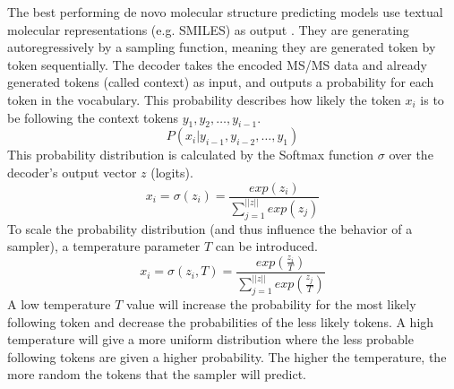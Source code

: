 The best performing de novo molecular structure predicting models use textual molecular representations (e.g. SMILES) as output \cite{litsa2021spec2mol, shrivastava2021massgenie, butler2023ms2mol}.
They are generating autoregressively by a sampling function, meaning they are generated token by token sequentially. The decoder takes the encoded \ac{MS/MS} data and already generated tokens (called context) as input, and outputs a probability for each token in the vocabulary. This probability describes how likely the token $x_i$ is to be following the context tokens $y_{1}, y_{2}, \dots, y_{i-1}$. 
\[P(x_i | y_{i-1},y_{i-2},\dots,y_{1})\]
This probability distribution is calculated by the Softmax function $\sigma$ \cite{nwankpa2018activation} over the decoder's output vector $z$ (logits).
\[x_i = \sigma(z_i) = \frac{exp(z_i)}{\sum\limits_{j=1}^{||z||} exp(z_j)}\]
To scale the probability distribution (and thus influence the behavior of a sampler), a temperature parameter $T$ can be introduced. 
\[x_i = \sigma(z_i, T) = \frac{exp(\frac{z_i}{T})}{\sum\limits_{j=1}^{||z||} exp(\frac{z_j}{T})}\]
A low temperature $T$ value will increase the probability for the most likely following token and decrease the probabilities of the less likely tokens. A high temperature will give a more uniform distribution where the less probable following tokens are given a higher probability. The higher the temperature, the more random the tokens that the sampler will predict. 

